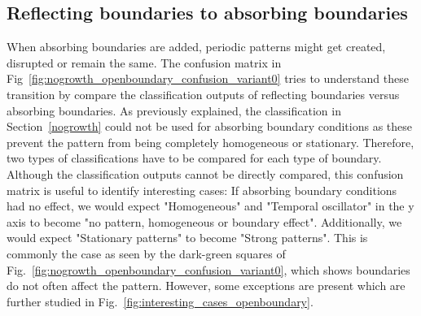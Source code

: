 \subsection{Reflecting boundaries to absorbing boundaries}
When absorbing boundaries are added, periodic patterns might get created, disrupted or remain the same.
The confusion matrix in Fig~\ref{fig:nogrowth_openboundary_confusion_variant0} tries to understand these transition by compare the classification outputs of reflecting boundaries versus absorbing boundaries.
As previously explained, the classification in Section~\ref{nogrowth} could not be used for absorbing boundary conditions as these prevent the pattern from being completely homogeneous or stationary.
Therefore, two types of classifications have to be compared for each type of boundary.
Although the classification outputs cannot be directly compared, this confusion matrix is useful to identify interesting cases:
If absorbing boundary conditions had no effect, we would expect "Homogeneous" and "Temporal oscillator" in the y axis to become "no pattern, homogeneous or boundary effect".
Additionally, we would expect "Stationary patterns" to become "Strong patterns".
This is commonly the case as seen by the dark-green squares of Fig.~\ref{fig:nogrowth_openboundary_confusion_variant0}, which shows boundaries do not often affect the pattern.
However, some exceptions are present which are further studied in Fig.~\ref{fig:interesting_cases_openboundary}.

